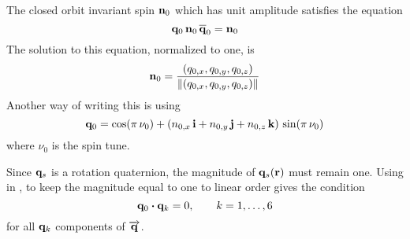The closed orbit invariant spin ${\bf n}_0$ which has unit amplitude satisfies the equation
\begin{equation}
  \bfq_0 \, \bfn_0 \, \BAR\bfq_0 = \bfn_0
  \label{qnqn}
\end{equation}
The solution to this equation, normalized to one, is
\begin{equation}
  {\bf n}_0 = \frac{(q_{0,x}, q_{0,y}, q_{0,z})}{\|(q_{0,x}, q_{0,y}, q_{0,z})\|}
  \label{nkqqq}
\end{equation}
Another way of writing this is using 
\begin{equation}
  {\bf q}_0 = \cos(\pi \, \nu_0) + 
  (n_{0,x} \, {\bf i} + n_{0,y} \, {\bf j} + n_{0,z} \, {\bf k}) \, \sin(\pi \, \nu_0)
  \label{qnni}
\end{equation}
where $\nu_0$ is the spin tune.

Since ${\bf q}_s$ is a rotation quaternion, the magnitude of ${\bf q}_s({\bf r})$ must remain one. Using
 in , to keep the magnitude equal to one to linear order gives the condition
\begin{equation}
  {\bf q}_0 \mathbin{\boldsymbol{\cdot}} {\bf q}_k = 0, \qquad k = 1, \ldots, 6
\end{equation}
for all ${\bf q}_k$ components of $\overrightarrow{{\bf q}}$.

